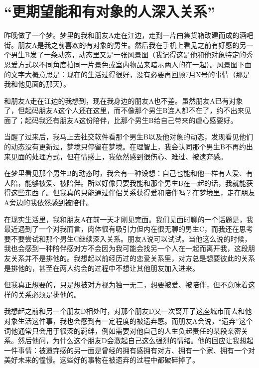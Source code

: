 \chapter{“更期望能和有对象的人深入关系”}





昨晚做了一个梦。梦里的我和朋友A走在江边，走到一片由集货箱改建而成的酒吧街。朋友A是我之前喜欢的有对象的男生。然后我在手机上看见之前有好感的另一个男生B发了一条动态，动态里又是一张风景图（我记得这是他和他对象特定的秀恩爱方式\pozhehao{}以不同角度拍同一片景色或室内物品来暗示两人的在一起）。风景图下面的文字大概意思是：现在的生活过得很好，没有必要再回顾7月X号的事情（那是我和他见面的那天）。

和朋友A走在江边的我想到，现在我身边的朋友A也不差。虽然朋友A已有对象了，但起码朋友A这个人还在这里，而不像那个男生B连人都不在了，约不出来见面了；起码我还有朋友A这份陪伴，比那个男生B给自己带来的虐心感要好。

当醒了过来后，我马上去社交软件看那个男生B以及他对象的动态，发现看见他们的动态没有更新过，梦境只停留在梦境。在理智上，我会认同那个男生B不再约出来见面的处理方式，但在情感上，我依然感到很伤心、难过、被遗弃感。

在梦里看见那个男生B的动态时，我会有一种设想：自己也能和他一样有人爱、有人陪，能够被爱、被陪伴。所以好像只要我能和那个男生B在一起的话，我就能获得这些东西了。但我真的只能通过伴侣关系获得爱和陪伴吗？在梦境里，走在朋友A旁边的我依然感到被陪伴。

在现实生活里，我和朋友A在前一天才刚见完面。我们见面时聊的一个话题是，我最近遇到了一个对我而言，肉体很有吸引力但内在很无聊的男生C，而我还在思考要不要尝试和那个男生C继续深入关系。朋友A说可以试试。当他这么说的时候，我也会感到一种陪伴感\pozhehao{}对方不会因为我可能会找另一个人在一起而离开我，这段朋友关系并不是排他的。我想起以前经历过的恋爱关系里，对方总是想要彼此的关系是排他的，甚至在两人约会的过程中不想让其他朋友加入进来。

但我真正想要的，只是想被对方视为独一无二，想要被爱、被陪伴，但不意味着这样的关系必须是排他的。

我想起之前和另一个朋友D相处时，对那个朋友D又一次离开了这座城市而去和他对象生活这件事，我也会感到有一定程度的被遗弃感。而朋友A会说，“遗弃”这个词他通常只会用于很深的羁绊，例如需要对他自己的人生负起责任的某段亲密关系。然后他问，为什么这个朋友D会激起自己这么强烈的情绪。他的回应让我想起一件事情：被遗弃感的另一面是曾经的拥有感\pozhehao{}拥有对方、拥有一个家、拥有一个对美好未来的憧憬。这些好的事物在被遗弃的过程中都破碎掉了。

